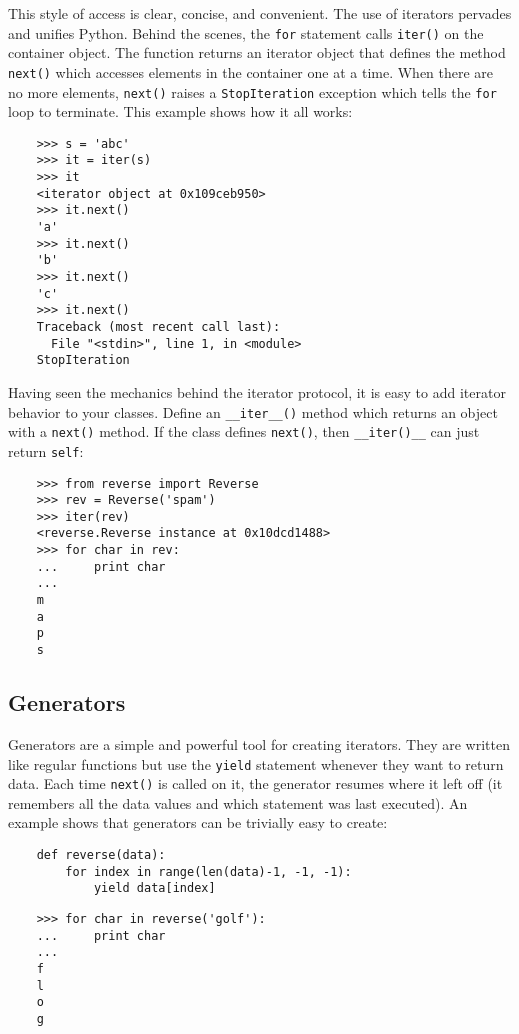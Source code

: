\documentclass[UTF8]{article}
\begin{document}
This style of access is clear, concise, and convenient. The use of iterators pervades and unifies
Python. Behind the scenes, the \texttt{for} statement calls \texttt{iter()} on the container object.
The function returns an iterator object that defines the method \texttt{next()} which accesses
elements in the container one at a time. When there are no more elements, \texttt{next()} raises a
\texttt{StopIteration} exception which tells the \texttt{for} loop to terminate. This example shows
how it all works:
\begin{verbatim}
    >>> s = 'abc'
    >>> it = iter(s)
    >>> it
    <iterator object at 0x109ceb950>
    >>> it.next()
    'a'
    >>> it.next()
    'b'
    >>> it.next()
    'c'
    >>> it.next()
    Traceback (most recent call last):
      File "<stdin>", line 1, in <module>
    StopIteration
\end{verbatim}

Having seen the mechanics behind the iterator protocol, it is easy to add iterator behavior to your
classes. Define an \texttt{\_\_iter\_\_()} method which returns an object with a \texttt{next()}
method. If the class defines \texttt{next()}, then \texttt{\_\_iter()\_\_} can just return
\texttt{self}:
\begin{verbatim}
    >>> from reverse import Reverse
    >>> rev = Reverse('spam')
    >>> iter(rev)
    <reverse.Reverse instance at 0x10dcd1488>
    >>> for char in rev:
    ...     print char
    ...
    m
    a
    p
    s
\end{verbatim}

\subsection{Generators}
Generators are a simple and powerful tool for creating iterators. They are written like regular
functions but use the \texttt{yield} statement whenever they want to return data. Each time
\texttt{next()} is called on it, the generator resumes where it left off (it remembers all the data
values and which statement was last executed). An example shows that generators can be trivially
easy to create:
\begin{verbatim}
    def reverse(data):
        for index in range(len(data)-1, -1, -1):
            yield data[index]
\end{verbatim}
\begin{verbatim}
    >>> for char in reverse('golf'):
    ...     print char
    ...
    f
    l
    o
    g
\end{verbatim}
\end{document}
